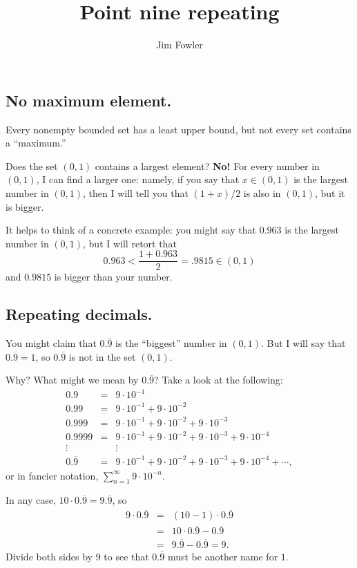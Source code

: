 \documentclass[11pt]{handout}
\title{Point nine repeating}
\author{Jim Fowler}
\begin{document}
\maketitle

\subsection*{No maximum element.}

Every nonempty bounded set has a least upper bound, but not every set
contains a ``maximum.''

Does the set $(0,1)$ contains a largest element?  \textbf{No!}  For
every number in $(0,1)$, I can find a larger one: namely, if you say
that $x \in (0,1)$ is the largest number in $(0,1)$, then I will tell
you that $(1 + x)/2$ is also in $(0,1)$, but it is bigger.

It helps to think of a concrete example: you might say that $0.963$ is
the largest number in $(0,1)$, but I will retort that
$$
0.963 < \frac{1 + 0.963}{2} = .9815 \in (0,1)
$$
and $0.9815$ is bigger than your number.

\subsection*{Repeating decimals.}

You might claim that $0.\overline{9}$ is the ``biggest'' number in
$(0,1)$.  But I will say that $0.\overline{9} = 1$, so $0.\overline{9}$
is not in the set $(0,1)$.

Why?  What might we mean by $0.\overline{9}$?  Take a look at the following:
\begin{eqnarray*}
0.9 &=& 9 \cdot 10^{-1} \\
0.99 &=& 9 \cdot 10^{-1} + 9 \cdot 10^{-2} \\
0.999 &=& 9 \cdot 10^{-1} + 9 \cdot 10^{-2} + 9 \cdot 10^{-3} \\
0.9999 &=& 9 \cdot 10^{-1} + 9 \cdot 10^{-2} + 9 \cdot 10^{-3} + 9 \cdot 10^{-4} \\
\vdots & & \vdots \\
0.\overline{9} &=& 9 \cdot 10^{-1} + 9 \cdot 10^{-2} + 9 \cdot 10^{-3} + 9 \cdot 10^{-4} + \cdots,
\end{eqnarray*}
or in fancier notation, $\displaystyle\sum_{n=1}^\infty 9 \cdot 10^{-n}$.

In any case, $10 \cdot 0.\overline{9} = 9.\overline{9}$, so
\begin{eqnarray*}
9 \cdot 0.\overline{9} &=& (10 - 1) \cdot 0.\overline{9} \\
&=& 10 \cdot 0.\overline{9} - 0.\overline{9} \\
&=& 9.\overline{9} - 0.\overline{9} = 9.
\end{eqnarray*}
Divide both sides by $9$ to see that $0.\overline{9}$ must be another
name for $1$.
\end{document}
